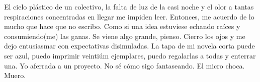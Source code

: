 
El cielo plástico de un colectivo, la falta de luz de la casi noche y el olor
a tantas respiraciones concentradas en llegar me impiden leer. Entonces, me
acuerdo de lo mucho que hace que no escribo. Como si una idea estuviese echando
raíces y consumiendo(me) las ganas. Se viene algo grande, pienso. Cierro los
ojos y me dejo entusiasmar con expectativas disimuladas. La tapa de mi novela
corta puede ser azul, puedo imprimir veintiúm ejemplares, puedo regalarlas a
todas y enterrar una. Yo aferrada a un proyecto. No sé cómo sigo fantaseando.
El micro choca. Muero.
